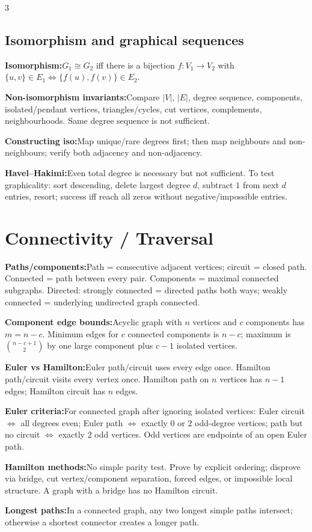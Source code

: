 \documentclass[10pt]{article}
\newenvironment{cheatitems}{\par\vspace{-1pt}}{\par\vspace{-1pt}}
\newcommand{\cheatrow}[2]{\par\noindent\textbf{#1:}\enspace #2\par}
\begin{document}
\begin{multicols}{3}
\subsection*{Isomorphism and graphical sequences}
\begin{cheatitems}
\cheatrow{Isomorphism}{$G_1\cong G_2$ iff there is a bijection $f:V_1\to V_2$ with $\{u,v\}\in E_1\Leftrightarrow\{f(u),f(v)\}\in E_2$.}
\cheatrow{Non-isomorphism invariants}{Compare $|V|$, $|E|$, degree sequence, components, isolated/pendant vertices, triangles/cycles, cut vertices, complements, neighbourhoods. Same degree sequence is not sufficient.}
\cheatrow{Constructing iso}{Map unique/rare degrees first; then map neighbours and non-neighbours; verify both adjacency and non-adjacency.}
\cheatrow{Havel--Hakimi}{Even total degree is necessary but not sufficient. To test graphicality: sort descending, delete largest degree $d$, subtract $1$ from next $d$ entries, resort; success iff reach all zeros without negative/impossible entries.}
\end{cheatitems}

\section*{Connectivity / Traversal}
\begin{cheatitems}
\cheatrow{Paths/components}{Path = consecutive adjacent vertices; circuit = closed path. Connected = path between every pair. Components = maximal connected subgraphs. Directed: strongly connected = directed paths both ways; weakly connected = underlying undirected graph connected.}
\cheatrow{Component edge bounds}{Acyclic graph with $n$ vertices and $c$ components has $m=n-c$. Minimum edges for $c$ connected components is $n-c$; maximum is $\binom{n-c+1}{2}$ by one large component plus $c-1$ isolated vertices.}
\cheatrow{Euler vs Hamilton}{Euler path/circuit uses every edge once. Hamilton path/circuit visits every vertex once. Hamilton path on $n$ vertices has $n-1$ edges; Hamilton circuit has $n$ edges.}
\cheatrow{Euler criteria}{For connected graph after ignoring isolated vertices: Euler circuit $\iff$ all degrees even; Euler path $\iff$ exactly $0$ or $2$ odd-degree vertices; path but no circuit $\iff$ exactly $2$ odd vertices. Odd vertices are endpoints of an open Euler path.}
\cheatrow{Hamilton methods}{No simple parity test. Prove by explicit ordering; disprove via bridge, cut vertex/component separation, forced edges, or impossible local structure. A graph with a bridge has no Hamilton circuit.}
\cheatrow{Longest paths}{In a connected graph, any two longest simple paths intersect; otherwise a shortest connector creates a longer path.}
\end{cheatitems}


\end{multicols}
\end{document}
